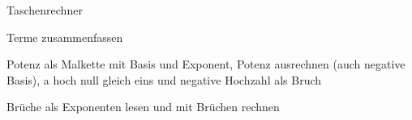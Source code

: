 \begin{aufgabe}{Taschenrechner}
\end{aufgabe}

\begin{aufgabe}{Terme zusammenfassen}
\end{aufgabe}

\begin{aufgabe}{Potenz als Malkette mit Basis und Exponent, Potenz ausrechnen (auch negative Basis), a hoch null gleich eins und negative Hochzahl als Bruch}
\end{aufgabe}

\begin{aufgabe}{Brüche als Exponenten lesen und mit Brüchen rechnen}
\end{aufgabe}

